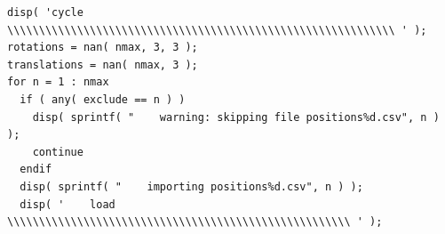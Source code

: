 \documentclass[11pt, a4paper, oneside, twocolumn]{report}
\begin{document}
\begin{verbatim}
disp( 'cycle \\\\\\\\\\\\\\\\\\\\\\\\\\\\\\\\\\\\\\\\\\\\\\\\\\\\\\\\\\\\\ ' );
rotations = nan( nmax, 3, 3 );
translations = nan( nmax, 3 );
for n = 1 : nmax
  if ( any( exclude == n ) )
    disp( sprintf( "    warning: skipping file positions%d.csv", n ) );
    continue
  endif
  disp( sprintf( "    importing positions%d.csv", n ) );
  disp( '    load \\\\\\\\\\\\\\\\\\\\\\\\\\\\\\\\\\\\\\\\\\\\\\\\\\\\\\ ' );
  

\end{verbatim}
\end{document}
